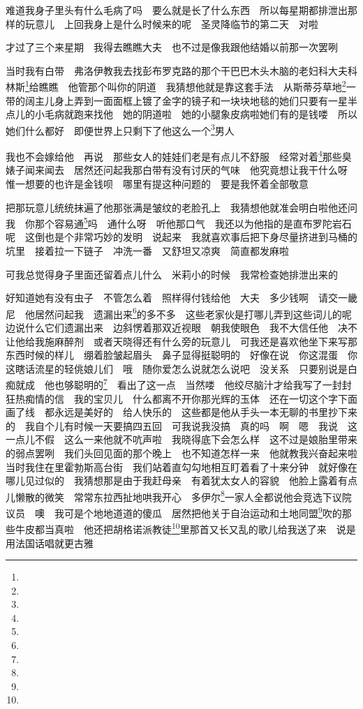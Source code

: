 \par 难道我身子里头有什么毛病了吗　要么就是长了什么东西　所以每星期都排泄出那样的玩意儿　上回我身上是什么时候来的呢　圣灵降临节的第二天　对啦　
\par 才过了三个来星期　我得去瞧瞧大夫　也不过是像我跟他结婚以前那一次罢咧　
\par 当时我有白带　弗洛伊教我去找彭布罗克路的那个干巴巴木头木脑的老妇科大夫科林斯\footnote{}给瞧瞧　他管那个叫你的阴道　我猜想他就是靠这套手法　从斯蒂芬草地\footnote{}一带的阔主儿身上弄到一面面框上镀了金字的镜子和一块块地毯的她们只要有一星半点儿的小毛病就跑来找他　她的阴道啦　她的小腿象皮病啦她们有的是钱喽　所以她们什么都好　即便世界上只剩下了他这么一个\footnote{}男人　
\par 我也不会嫁给他　再说　那些女人的娃娃们老是有点儿不舒服　经常对着\footnote{}那些臭婊子闻来闻去　居然还问起我那白带有没有讨厌的气味　他究竟想让我干什么呀　惟一想要的也许是金钱呗　哪里有提这种问题的　要是我怀着全部敬意　
\par 把那玩意儿统统抹遍了他那张满是皱纹的老脸孔上　我猜想他就准会明白啦他还问我　你那个容易通\footnote{}吗　通什么呀　听他那口气　我还以为他指的是直布罗陀岩石呢　这倒也是个非常巧妙的发明　说起来　我就喜欢事后把下身尽量挤进到马桶的坑里　接着拉一下链子　冲洗一番　又舒坦又凉爽　简直都发麻啦　
\par 可我总觉得身子里面还留着点儿什么　米莉小的时候　我常检查她排泄出来的　
\par 好知道她有没有虫子　不管怎么着　照样得付钱给他　大夫　多少钱啊　请交一畿尼　他居然问起我　遗漏出来\footnote{}的多不多　这些老家伙是打哪儿弄到这些词儿的呢　边说什么它们遗漏出来　边斜愣着那双近视眼　朝我使眼色　我不大信任他　决不让他给我施麻醉剂　或者天晓得还有什么旁的玩意儿　可我还是喜欢他坐下来写那东西时候的样儿　绷着脸皱起眉头　鼻子显得挺聪明的　好像在说　你这混蛋　你这瞎话流星的轻佻娘儿们　哦　随你爱怎么说就怎么说吧　没关系　只要别说是白痴就成　他也够聪明的\footnote{}　看出了这一点　当然喽　他绞尽脑汁才给我写了一封封狂热痴情的信　我的宝贝儿　什么都离不开你那光辉的玉体　还在一切这个字下面画了线　都永远是美好的　给人快乐的　这些都是他从手头一本无聊的书里抄下来的　我自个儿有时候一天要搞四五回　可我说我没搞　真的吗　啊　嗯　我说　这一点儿不假　这么一来他就不吭声啦　我晓得底下会怎么样　这不过是娘胎里带来的弱点罢咧　我们头回见面的那个晚上　也不知道怎样一来　他就教我兴奋起来啦　当时我住在里霍勃斯高台街　我们站着直勾勾地相互盯着看了十来分钟　就好像在哪儿见过似的　我猜想那是由于我赶母亲　有着犹太女人的容貌　他脸上露着有点儿懒散的微笑　常常东拉西扯地哄我开心　多伊尔\footnote{}一家人全都说他会竞选下议院议员　噢　我可是个地地道道的傻瓜　居然把他关于自治运动和土地同盟\footnote{}吹的那些牛皮都当真啦　他还把胡格诺派教徒\footnote{}里那首又长又乱的歌儿给我送了来　说是用法国话唱就更古雅　
